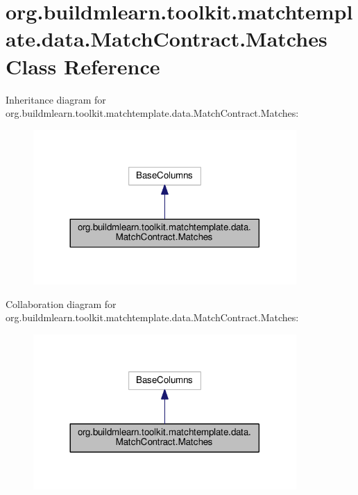 \hypertarget{classorg_1_1buildmlearn_1_1toolkit_1_1matchtemplate_1_1data_1_1MatchContract_1_1Matches}{}\section{org.\+buildmlearn.\+toolkit.\+matchtemplate.\+data.\+Match\+Contract.\+Matches Class Reference}
\label{classorg_1_1buildmlearn_1_1toolkit_1_1matchtemplate_1_1data_1_1MatchContract_1_1Matches}


Inheritance diagram for org.\+buildmlearn.\+toolkit.\+matchtemplate.\+data.\+Match\+Contract.\+Matches\+:
\nopagebreak
\begin{figure}[H]
\begin{center}
\leavevmode
\includegraphics[width=284pt]{classorg_1_1buildmlearn_1_1toolkit_1_1matchtemplate_1_1data_1_1MatchContract_1_1Matches__inherit__graph}
\end{center}
\end{figure}


Collaboration diagram for org.\+buildmlearn.\+toolkit.\+matchtemplate.\+data.\+Match\+Contract.\+Matches\+:
\nopagebreak
\begin{figure}[H]
\begin{center}
\leavevmode
\includegraphics[width=284pt]{classorg_1_1buildmlearn_1_1toolkit_1_1matchtemplate_1_1data_1_1MatchContract_1_1Matches__coll__graph}
\end{center}
\end{figure}
